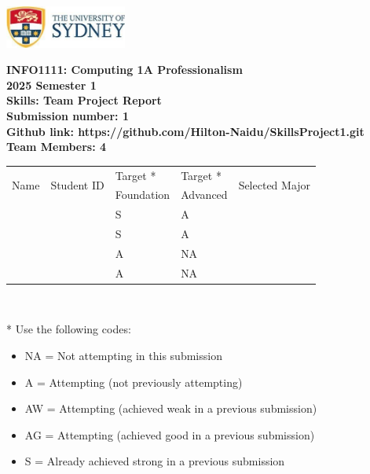\documentclass[a4paper, 11pt]{report}
\begin{document}
\begin{titlepage}
\begin{flushright}
\includegraphics[width=4cm]{USyd.jpg}\\[1cm]
\end{flushright}

\begin{centering}
\textbf{\huge INFO1111: Computing 1A Professionalism}\\[0.75cm]
\textbf{\huge 2025 Semester 1}\\[2cm]
\textbf{\huge Skills: Team Project Report}\\[2cm]

\textbf{\large Submission number: 1}\\[0.5cm]
\textbf{\large Github link: https://github.com/Hilton-Naidu/SkillsProject1.git }\\[0.75cm]
\textbf{\huge Team Members: 4}\\[0.75cm]

\begin{tabular}{|p{}|p{}|p{}|p{}|p{}|}
	\hline
	\multirow{2}{*}{Name} & \multirow{2}{*}{Student ID} & Target * & Target * & \multirow{2}{*}{Selected Major} \\
	 & & Foundation & Advanced & \\
	\hline
	\hline
	\raggedright{\studA} & \sidA & S & A & \majA \\
	\hline
	\raggedright{\studB} & \sidB & S & A & \majB \\
	\hline
	\raggedright{\studC} & \sidC & A & NA & \majC \\
	\hline
	\raggedright{\studD} & \sidD & A & NA & \majD \\
	\hline
\end{tabular}
\\[0.5cm]
\end{centering}

* Use the following codes:
\begin{itemize}
\setlength\itemsep{0em}
\item NA = Not attempting in this submission
\item A = Attempting (not previously attempting)
\item AW = Attempting (achieved weak in a previous submission) 
\item AG = Attempting (achieved good in a previous submission)
\item S = Already achieved strong in a previous submission
\end{itemize}

\thispagestyle{empty}
\end{titlepage}
\end{document}

